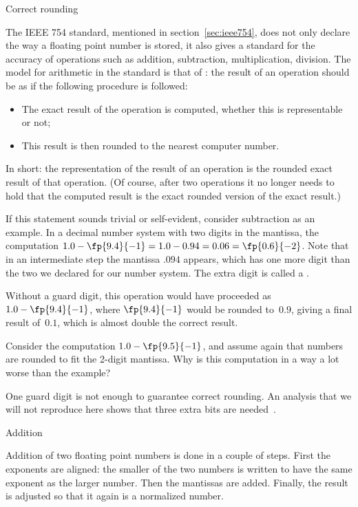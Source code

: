 {Correct rounding}

The IEEE 754 standard, mentioned in section~\ref{sec:ieee754}, does
not only declare the way a floating point number is stored, it also
gives a standard for the accuracy of operations such as addition,
subtraction, multiplication, division. The model for arithmetic in the
standard is that of : the result of an
operation should be as if the following procedure is followed:
\begin{itemize}
\item The exact result of the operation is computed, whether this is
  representable or not;
\item This result is then rounded to the nearest computer number.
\end{itemize}
In short: the representation of the result of an
operation is the rounded exact result of that operation. (Of course,
after two operations it no longer needs to hold that the computed
result is the exact rounded version of the exact result.)

If this statement sounds trivial or self-evident, consider subtraction
as an example. In a decimal number system with two digits in the
mantissa, the computation
$1.0-\fp{9.4}{-1}=1.0-0.94=0.06=\fp{0.6}{-2}$. Note that in an
intermediate step the mantissa $.094$ appears, which has one more
digit than the two we declared for our number system. The extra digit
is called a .

Without a guard digit, this operation would have proceeded as
$1.0-\fp{9.4}{-1}$, where $\fp{9.4}{-1}$ would be rounded to~$0.9$,
giving a final result of~$0.1$, which is almost double the correct result.
\begin{exercise}
  Consider the computation $1.0-\fp{9.5}{-1}$, and assume again that
  numbers are rounded to fit the 2-digit mantissa. Why is this
  computation in a way a lot worse than the example?
\end{exercise}
One guard digit is not enough to guarantee correct rounding. An
analysis that we will not reproduce here shows that three extra bits
are needed~\cite{Goldberg:arithmetic}.

 {Addition}

Addition of two floating point numbers is done in a couple of steps.
First the exponents are aligned: the smaller of the two numbers is
written to have the same exponent as the larger number. Then the
mantissas are added. Finally, the result is adjusted
so that it again is a normalized number.


